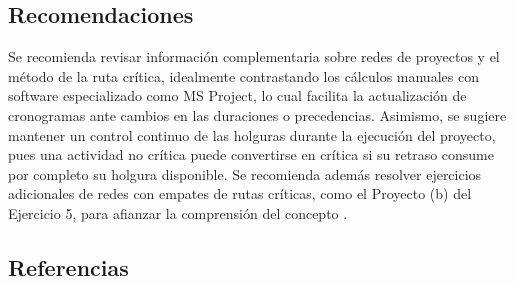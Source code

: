 \documentclass{article}
\begin{document}
\subsection{Recomendaciones}
Se recomienda revisar información complementaria sobre redes de proyectos y el método de la ruta crítica, idealmente contrastando los cálculos manuales con software especializado como MS Project, lo cual facilita la actualización de cronogramas ante cambios en las duraciones o precedencias. Asimismo, se sugiere mantener un control continuo de las holguras durante la ejecución del proyecto, pues una actividad no crítica puede convertirse en crítica si su retraso consume por completo su holgura disponible. Se recomienda además resolver ejercicios adicionales de redes con empates de rutas críticas, como el Proyecto (b) del Ejercicio 5, para afianzar la comprensión del concepto \cite{taha2017, pmi2017}.

\subsection{Referencias}

\vspace{-3em} %
\renewcommand{\refname}{}


\end{document}
